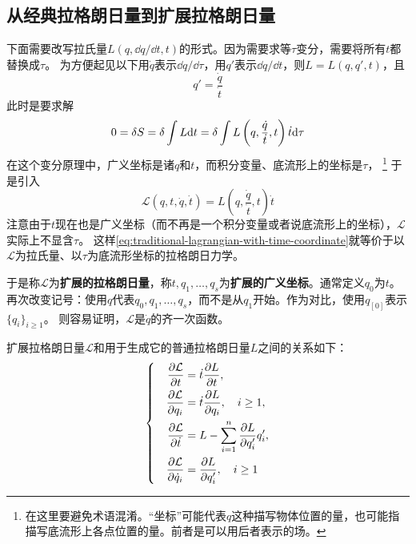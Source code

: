 \documentclass[UTF8, a4paper]{ctexart}
\newenvironment{bigcase}{\left\{\quad\begin{aligned}}{\end{aligned}\right.}
\begin{document}
\subsection{从经典拉格朗日量到扩展拉格朗日量}
下面需要改写拉氏量$L(q, \dd q / \dd t, t)$的形式。因为需要求等$\tau$变分，需要将所有$t$都替换成$\tau$。
为方便起见以下用$\dot{q}$表示$\dd q / \dd \tau$，用$q'$表示$\dd q / \dd t$，则$L=L(q, q', t)$，且
\begin{equation}
    q' = \frac{\dot{q}}{\dot{t}}
\end{equation}
此时是要求解
\begin{equation}
    0 = \var S = \var \int L \dd t = \var \int L\left(q, \frac{\dot{q}}{\dot{t}}, t\right) \dot{t} \dd \tau
\end{equation}
在这个变分原理中，广义坐标是诸$q$和$t$，而积分变量、底流形上的坐标是$\tau$，%
\footnote{在这里要避免术语混淆。“坐标”可能代表$q$这种描写物体位置的量，也可能指描写底流形上各点位置的量。前者是可以用后者表示的场。}%
于是引入
\begin{equation}
    \mathcal{L}(q, t, \dot{q}, \dot{t}) = L\left(q, \frac{\dot{q}}{\dot{t}}, t\right) \dot{t}
    \label{eq:traditional-lagrangian-with-time-coordinate}
\end{equation}
注意由于$t$现在也是广义坐标（而不再是一个积分变量或者说底流形上的坐标），$\mathcal{L}$实际上不显含$\tau$。
这样\eqref{eq:traditional-lagrangian-with-time-coordinate}就等价于以$\mathcal{L}$为拉氏量、以$\tau$为底流形坐标的拉格朗日力学。

于是称$\mathcal{L}$为\textbf{扩展的拉格朗日量}，称$t, q_1, \ldots, q_s$为\textbf{扩展的广义坐标}。通常定义$q_0$为$t$。
再次改变记号：使用$q$代表$q_0, q_1, \ldots, q_s$，而不是从$q_1$开始。作为对比，使用$q_{[0]}$表示$\{q_i\}_{i\geq 1}$。
则容易证明，$\mathcal{L}$是$\dot{q}$的齐一次函数。

扩展拉格朗日量$\mathcal{L}$和用于生成它的普通拉格朗日量$L$之间的关系如下：
\begin{equation}
    \begin{bigcase}
        \pdv{\mathcal{L}}{t} &= \dot{t} \pdv{L}{t}, \\
        \pdv{\mathcal{L}}{q_i} &= \dot{t} \pdv{L}{q_i}, \quad i \geq 1, \\
        \pdv{\mathcal{L}}{\dot{t}} &= L - \sum_{i=1}^n \pdv{L}{q_i'} q_i', \\
        \pdv{\mathcal{L}}{\dot{q}_i} &= \pdv{L}{q_i'}, \quad i \geq 1
    \end{bigcase}
    \label{eq:transform-time-as-coordinate}
\end{equation}
\end{document}
